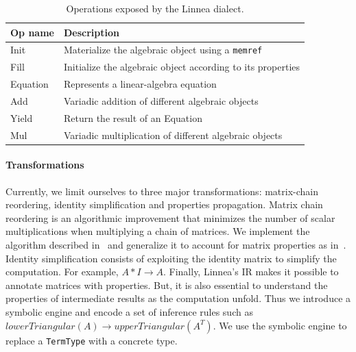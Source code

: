 \documentclass[conference]{IEEEtran}
\begin{document}
\begin{table}
\begin{center}
\begin{tabular}{ll}
    \toprule
    \footnotesize{Op name}     & \footnotesize{Description} \\ \midrule
    \footnotesize{Init} & \footnotesize{Materialize the algebraic object using a \texttt{memref}} \\
    \rowcolor{aluminium1}
    \footnotesize{Fill} & \footnotesize{Initialize the algebraic object according to its properties}  \\
    \footnotesize{Equation} & \footnotesize{Represents a linear-algebra equation} \\
    \rowcolor{aluminium1}
    \footnotesize{Add} & \footnotesize{Variadic addition of different algebraic objects} \\ 
    \footnotesize{Yield} & \footnotesize{Return the result of an Equation} \\
    \rowcolor{aluminium1}
    \footnotesize{Mul} & \footnotesize{Variadic multiplication of different algebraic objects} \\ \bottomrule
\end{tabular}
\end{center}
\caption{Operations exposed by the Linnea dialect.}
\label{table:operations}
\end{table} 

\paragraph{Transformations}

Currently, we limit ourselves to three major
transformations: matrix-chain reordering, identity simplification and
properties propagation. Matrix chain reordering is an algorithmic improvement
that minimizes the number of scalar multiplications when multiplying a chain of
matrices. We implement the algorithm described in~\cite{cormen2009introduction}
and generalize it to account for matrix properties as
in~\cite{10.1145/3446632}. Identity simplification consists of exploiting
the identity matrix to simplify the computation. For example, $A * I
\rightarrow A$.  Finally, Linnea's IR makes it possible to annotate matrices
with properties. But, it is also essential to understand the properties of
intermediate results as the computation unfold. Thus we introduce a symbolic
engine and encode a set of inference rules such as $lowerTriangular(A)
\rightarrow upperTriangular(A^T)$. We use the symbolic engine to replace a
\texttt{TermType} with a concrete type.
\end{document}
